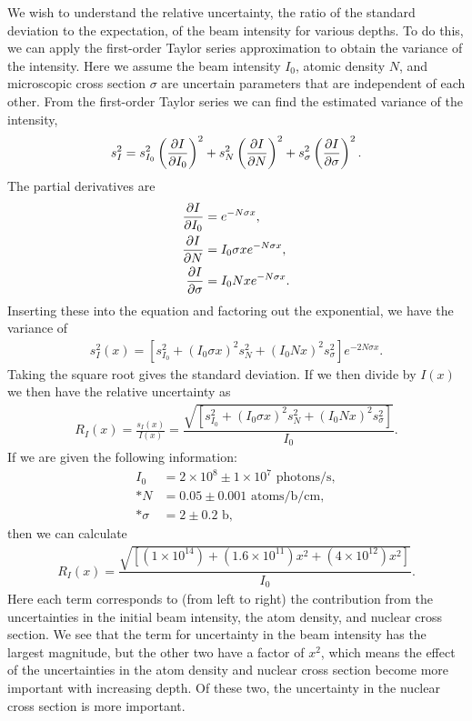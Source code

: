 We wish to understand the relative uncertainty, the ratio of the standard deviation to the expectation, of the beam intensity for various depths. To do this, we can apply the first-order Taylor series approximation to obtain the variance of the intensity. Here we assume the beam intensity $I_0$, atomic density $N$, and microscopic cross section $\sigma$ are uncertain parameters that are independent of each other. From the first-order Taylor series we can find the estimated variance of the intensity,
\begin{align}
  s_I^2 = s_{I_0}^2 \left( \frac{ \partial {I} }{ \partial {I_0} } \right)^2 + s_{N}^2 \left( \frac{ \partial {I} }{ \partial {N} } \right)^2 + s_{\sigma}^2 \left( \frac{ \partial {I} }{ \partial {\sigma} } \right)^2 .
\end{align}
The partial derivatives are
\begin{subequations}
\begin{align}
  \frac{ \partial {I} }{ \partial {I_0} }    &= e^{-N \sigma x}, \\
  \frac{ \partial {I} }{ \partial {N} }      &= I_0 \sigma x e^{-N \sigma x} , \\
  \frac{ \partial {I} }{ \partial {\sigma} } &= I_0 N x e^{-N \sigma x} .
\end{align}
\end{subequations}
Inserting these into the equation and factoring out the exponential, we have the variance of
\begin{align}
  s_I^2(x) = \left[  s_{I_0}^2 + ( I_0 \sigma x )^2 s_{N}^2 + ( I_0 N x )^2 s_{\sigma}^2 \right] e^{-2 N \sigma x} .
\end{align}
Taking the square root gives the standard deviation. If we then divide by $I(x)$ we then have the relative uncertainty as
\begin{align}
  R_I(x) = \frac{ s_I(x) }{ I(x) } = \dfrac{ \sqrt{ \left[  s_{I_0}^2 + ( I_0 \sigma x )^2 s_{N}^2 + ( I_0 N x )^2 s_{\sigma}^2 \right] } }{ I_0 } .
\end{align}
If we are given the following information:
\begin{align}
  I_0 &= 2 \times 10^8 \pm 1 \times 10^7 \text{ photons/s}, \nonumber \\*
  N   &= 0.05 \pm 0.001 \text{ atoms/b/cm}, \nonumber \\*
  \sigma &= 2 \pm 0.2 \text{ b} , \nonumber
\end{align}
then we can calculate
\begin{align}
  R_I(x) = \dfrac{ \sqrt{ \left[  ( 1 \times 10^{14} ) + ( 1.6 \times 10^{11} ) x^2 + ( 4 \times 10^{12} ) x^2  \right] } }{ I_0 } . \nonumber
\end{align}
Here each term corresponds to (from left to right) the contribution from the uncertainties in the initial beam intensity, the atom density, and nuclear cross section. We see that the term for uncertainty in the beam intensity has the largest magnitude, but the other two have a factor of $x^2$, which means the effect of the uncertainties in the atom density and nuclear cross section become more important with increasing depth. Of these two, the uncertainty in the nuclear cross section is more important.

